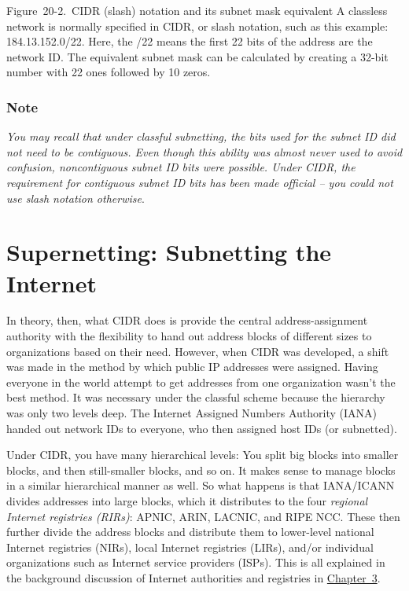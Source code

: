 \protect\hypertarget{ch20s02.htmlux5cux23cidr_slash_notation_and_its_subnet_mask_}{}{}

\protect\hypertarget{ch20s02.htmlux5cux23I_mediaobject6_d1e21549}{}{}

Figure~20-2.~CIDR (slash) notation and its subnet mask equivalent A
classless network is normally specified in CIDR, or slash notation, such
as this example: 184.13.152.0/22. Here, the /22 means the first 22 bits
of the address are the network ID. The equivalent subnet mask can be
calculated by creating a 32-bit number with 22 ones followed by 10
zeros.

\subsubsection[Note]{\texorpdfstring{\protect\hypertarget{ch20s02.htmlux5cux23note-79}{}{}Note}{Note}}

{\emph{You may recall that under classful subnetting, the bits used for
the subnet ID did not need to be contiguous. Even though this ability
was almost never used to avoid confusion, noncontiguous subnet ID bits
were possible. Under CIDR, the requirement for contiguous subnet ID bits
has been made official -- you could not use slash notation otherwise}}.

\section{Supernetting: Subnetting the Internet}

In theory, then, what CIDR does is provide the central
address-assignment authority with the flexibility to hand out address
blocks of different sizes to organizations based on their need. However,
when CIDR was developed, a shift was made in the method by which public
IP addresses were assigned. Having everyone in the world attempt to get
addresses from one organization wasn't the best method. It was necessary
under the classful scheme because the hierarchy was only two levels
deep. The Internet Assigned Numbers Authority (IANA) handed out network
IDs to everyone, who then assigned host IDs (or subnetted).

Under CIDR, you have many hierarchical levels: You split big blocks into
smaller blocks, and then still-smaller blocks, and so on. It makes sense
to manage blocks in a similar hierarchical manner as well. So what
happens is that
\protect\hypertarget{ch20s02.htmlux5cux23idx-CHP-20-0768}{}{}IANA/ICANN
divides addresses into large blocks, which it distributes to the four
\protect\hypertarget{ch20s02.htmlux5cux23idx-CHP-20-0769}{}{}{\emph{regional
Internet registries (RIRs)}}: APNIC, ARIN, LACNIC, and RIPE NCC. These
then further divide the address blocks and distribute them to
lower-level national Internet registries (NIRs), local Internet
registries (LIRs), and/or individual organizations such as Internet
service providers (ISPs). This is all explained in the background
discussion of Internet authorities and registries in
\protect\hyperlink{ch03.html}{Chapter~3}.

